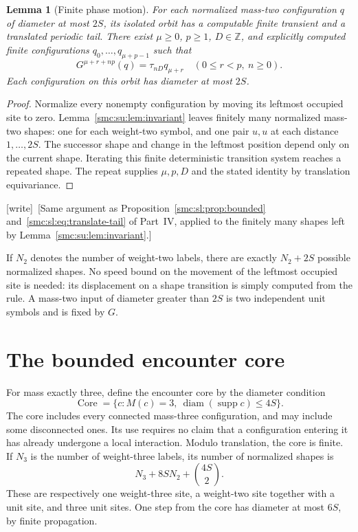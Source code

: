\documentclass[11pt,letterpaper]{article}
\numberwithin{equation}{section}
\newtheorem{lemma}[theorem]{Lemma}
\theoremstyle{definition}
\theoremstyle{remark}
\newcommand{\Z}{\mathbb Z}
\newcommand{\wtag}{\textup{[write]}}
\newcommand{\supp}{\operatorname{supp}}
\newcommand{\diam}{\operatorname{diam}}
\newcommand{\Core}{\operatorname{Core}}\newcommand{\Hit}{\operatorname{Hit}}\newcommand{\Rel}{\operatorname{Rel}}
\begin{document}
\begin{lemma}[Finite phase motion]\label{smc:su:lem:walker}
For each normalized mass-two configuration $q$ of diameter at most $2S$, its
isolated orbit has a computable finite transient and a translated periodic tail.
There exist $\mu\ge0$, $p\ge1$, $D\in\Z$, and explicitly computed finite
configurations $q_0,\ldots,q_{\mu+p-1}$ such that
\[
 G^{\mu+r+np}(q)=\tau_{nD}q_{\mu+r}
 \quad(0\le r<p,\ n\ge0).
\]
Each configuration on this orbit has diameter at most $2S$.
\end{lemma}
\begin{proof}
Normalize every nonempty configuration by moving its leftmost occupied site to
zero. Lemma~\ref{smc:su:lem:invariant} leaves finitely many normalized mass-two shapes:
one for each weight-two symbol, and one pair $u,u$ at each distance
$1,\ldots,2S$. The successor shape and change in the leftmost position depend
only on the current shape. Iterating this finite deterministic transition system
reaches a repeated shape. The repeat supplies $\mu,p,D$ and the stated identity
by translation equivariance.
\end{proof}
\wtag\ [Same argument as Proposition~\ref{smc:sl:prop:bounded} and~\eqref{smc:sl:eq:translate-tail} of Part~IV, applied to the finitely many shapes left by Lemma~\ref{smc:su:lem:invariant}.]

If $N_2$ denotes the number of weight-two labels, there are exactly $N_2+2S$
possible normalized shapes. No speed bound on the movement of the leftmost
occupied site is needed: its displacement on a shape transition is simply
computed from the rule. A mass-two input of diameter greater than $2S$ is two
independent unit symbols and is fixed by $G$.

\section{The bounded encounter core}\label{smc:su:sec:core}

For mass exactly three, define the encounter core by the diameter condition
\[
 \Core=\{c:M(c)=3,\ \diam(\supp c)\le4S\}.
\]
The core includes every connected mass-three configuration, and may include
some disconnected ones. Its use requires no claim that a configuration entering
it has already undergone a local interaction. Modulo translation, the core is
finite. If $N_3$ is the number of weight-three labels, its number of normalized
shapes is
\[
 N_3+8S N_2+\binom{4S}{2}.
\]
These are respectively one weight-three site, a weight-two site together with
a unit site, and three unit sites. One step from the core has diameter at most
$6S$, by finite propagation.
\end{document}
